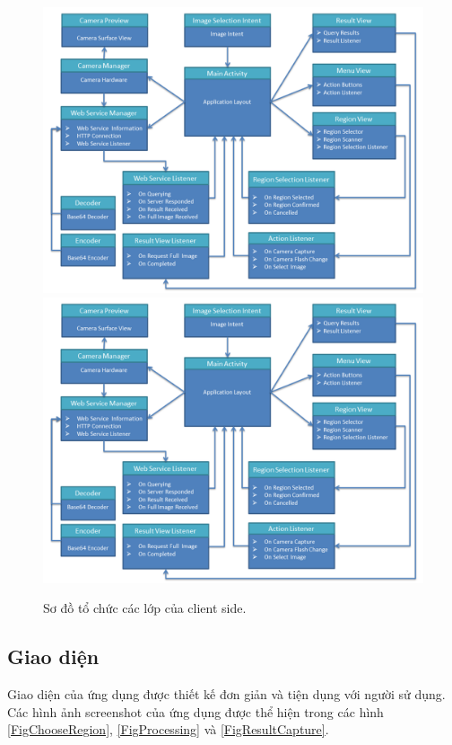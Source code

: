 {\begin{figure}[!htbp]
  \begin{center}
    \leavevmode
    \ifpdf
      \includegraphics[scale=0.19]{client_framework}
    \else
      \includegraphics[scale=0.19]{client_framework}
    \fi
    \caption[Sơ đồ tổ chức các lớp của client side]{Sơ đồ tổ chức các lớp của client side.}
    \label{FigClientFramework}
  \end{center}
\end{figure}

\subsection{Giao diện}
Giao diện của ứng dụng được thiết kế đơn giản và tiện dụng với người sử dụng. Các hình ảnh screenshot của ứng dụng được thể hiện trong các hình \ref{FigChooseRegion}, \ref{FigProcessing} và \ref{FigResultCapture}.

}
